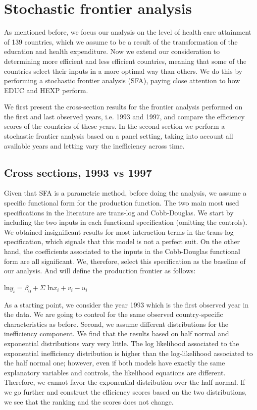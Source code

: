 \documentclass[12pt,a4paper]{article}\usepackage[]{graphicx}\usepackage[]{color}
\begin{document}
\section{Stochastic frontier analysis}

As mentioned before, we focus our analysis on the level of health care attainment of 139 countries, which we assume to be a result of the transformation of the education and health expenditure. Now we extend our consideration to determining more efficient and less efficient countries, meaning that some of the countries select their inputs in a more optimal way than others. We do this by performing a stochastic frontier analysis (SFA), paying close attention to how EDUC and HEXP perform.

We first present the cross-section results for the frontier analysis performed on the first and last observed years, i.e. 1993 and 1997, and compare the efficiency scores of the countries of these years. In the second section we perform a stochastic frontier analysis based on a panel setting, taking into account all available years and letting vary the inefficiency across time.

\subsection {Cross sections, 1993 vs 1997}
Given that SFA is a parametric method, before doing the analysis, we assume a specific functional form for the production function. The two main most used specifications in the literature are trans-log and Cobb-Douglas. We start by including the two inputs in each functional specification (omitting the controls). We obtained insignificant results for most interaction terms in the trans-log specification, which signals that this model is not a perfect suit. On the other hand, the coefficients associated to the inputs in the Cobb-Douglas functional form are all significant. We, therefore, select this specification as the baseline of our analysis. And will define the production frontier as follows: 
\begin{center}
ln$y_i=\beta_0+\Sigma$ ln$x_i+v_i-u_i$
\end{center}

As a starting point, we consider the year 1993 which is the first observed year in the data.  We are going to control for the same observed country-specific characteristics as before. Second, we assume different distributions for the inefficiency component. We find that the results based on half normal and exponential distributions vary very little. The log likelihood associated to the exponential inefficiency distribution is higher than the log-likelihood associated to the half normal one; however, even if both models have exactly the same explanatory variables and controls, the likelihood equations are different. Therefore, we cannot favor the exponential distribution over the half-normal. If we go further and construct the efficiency scores based on the two distributions, we see that the ranking and the scores does not change.
\end{document}
